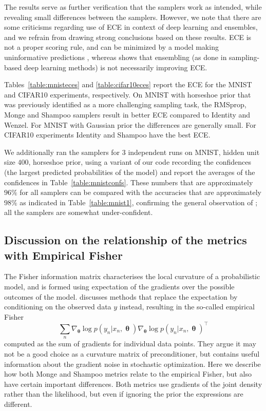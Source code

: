 \documentclass[10pt]{article} %
\DeclareMathOperator{\btheta}{\boldsymbol{\theta}}
\theoremstyle{plain}
\theoremstyle{definition}
\theoremstyle{remark}
\begin{document}
The results serve as further verification that the samplers work as intended, while revealing small differences between the samplers. However, we note that there are some criticisms regarding use of ECE in context of deep learning and ensembles, and we refrain from drawing strong conclusions based on these results. ECE is not a proper scoring rule, and can be minimized by a model making uninformative predictions \citep{Ovadia2019}, whereas \citet{Rahaman2021} shows that ensembling (as done in sampling-based deep learning methods) is not necessarily improving ECE. 

Tables~\ref{table:mnisteces} and \ref{table:cifar10eces} report the ECE for the MNIST and CIFAR10 experiments, respectively. On MNIST with horseshoe prior that was previously identified as a more challenging sampling task, the RMSprop, Monge and Shampoo samplers result in better ECE compared to Identity and Wenzel. For MNIST with Gaussian prior the differences are generally small. For CIFAR10 experiments Identity and Shampoo have the best ECE.

We additionally ran the samplers for $3$ independent runs on MNIST, hidden unit size $400$, horseshoe prior, using a variant of our code recording the confidences (the largest predicted probabilities of the model) and report the averages of the confidences in Table~\ref{table:mnistconfs}. These numbers that are approximately $96\%$ for all samplers can be compared with the accuracies that are approximately $98\%$ as indicated in Table~\ref{table:mnist1}, confirming the general observation of \citet{Rahaman2021}; all the samplers are somewhat under-confident.

\subsection{Discussion on the relationship of the metrics with Empirical Fisher}
\label{app:EF}

The Fisher information matrix characterises the local curvature of a probabilistic model, and is formed using expectation of the gradients over the possible outcomes of the model. \citet{Kunstner2019} discusses methods that replace the expectation by conditioning on the observed data $y$ instead, resulting in the so-called empirical Fisher
\begin{equation}
\sum_{n}\nabla_{\btheta}\log p(y_{n}|x_{n},\btheta)\nabla_{\btheta}\log p(y_{n}| x_{n},\btheta)^{\top}
\label{eq:EF}
\end{equation}
computed as the sum of gradients for individual data points. They argue it may not be a good choice as a curvature matrix of preconditioner, but contains useful information about the gradient noise in stochastic optimization. Here we describe how both Monge and Shampoo metrics relate to the empirical Fisher, but also have certain important differences. Both metrics use gradients of the joint density rather than the likelihood, but even if ignoring the prior the expressions are different.
\end{document}

